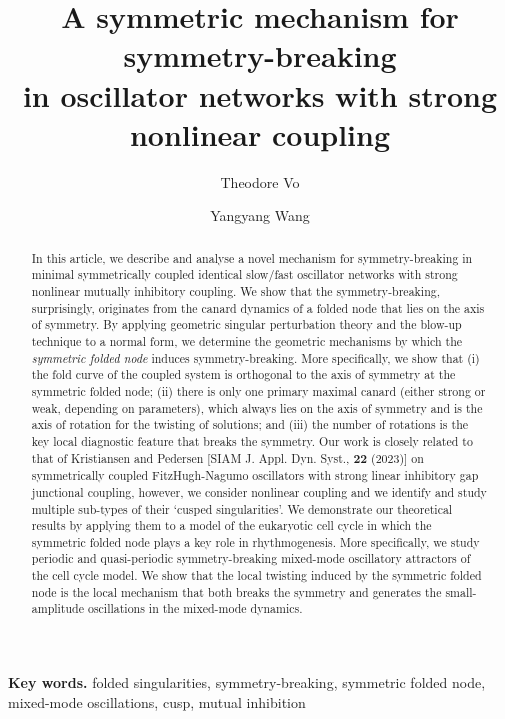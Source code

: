 \documentclass[10pt,onecolumn]{article}
\title{\vspace{-4em}A symmetric mechanism for symmetry-breaking\\ in oscillator networks with strong nonlinear coupling}
\author[1]{Theodore Vo}
\author[2]{Yangyang Wang}
\affil[1]{\footnotesize School of Mathematics, Monash University, Clayton, Victoria 3800, Australia}
\affil[2]{\footnotesize Department of Mathematics, Brandeis University, Waltham, Massachusetts 02453, USA}
\theoremstyle{plain}
\begin{document}

\maketitle

\begin{abstract} \noindent
In this article, we describe and analyse a novel mechanism for symmetry-breaking in minimal symmetrically coupled identical slow/fast oscillator networks with strong nonlinear mutually inhibitory coupling. We show that the symmetry-breaking, surprisingly, originates from the canard dynamics of a folded node that lies on the axis of symmetry. By applying geometric singular perturbation theory and the blow-up technique to a normal form, we determine the geometric mechanisms by which the {\em symmetric folded node} induces symmetry-breaking. More specifically, we show that (i) the fold curve of the coupled system is orthogonal to the axis of symmetry at the symmetric folded node; (ii) there is only one primary maximal canard (either strong or weak, depending on parameters), which always lies on the axis of symmetry and is the axis of rotation for the twisting of solutions; and (iii) the number of rotations is the key local diagnostic feature that breaks the symmetry. 
Our work is closely related to that of Kristiansen and Pedersen [SIAM J. Appl. Dyn. Syst., {\bf 22} (2023)] on symmetrically coupled FitzHugh-Nagumo oscillators with strong linear inhibitory gap junctional coupling, however, we consider nonlinear coupling and we identify and study multiple sub-types of their `cusped singularities'.
We demonstrate our theoretical results by applying them to a model of the eukaryotic cell cycle in which the symmetric folded node plays a key role in rhythmogenesis. More specifically, we study periodic and quasi-periodic symmetry-breaking mixed-mode oscillatory attractors of the cell cycle model. We show that the local twisting induced by the symmetric folded node is the local mechanism that both breaks the symmetry and generates the small-amplitude oscillations in the mixed-mode dynamics.
\end{abstract}

\noindent
{\bf Key words.} 
folded singularities,
symmetry-breaking,
symmetric folded node,
mixed-mode oscillations,
cusp,
mutual inhibition
\vspace{1em}
\end{document}
